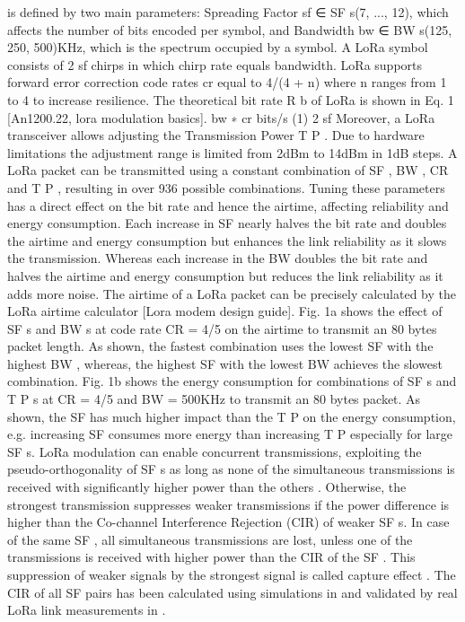 is defined by two main parameters:
	Spreading Factor sf ∈ SF s(7,
	..., 12),
	which affects the number of bits encoded per symbol,
	and Bandwidth bw ∈ BW s(125, 250, 500)KHz,
	which is the spectrum occupied by a symbol.
A LoRa symbol consists of 2 sf chirps in which chirp rate equals bandwidth.
LoRa supports forward error correction code rates cr equal to 4/(4 + n) where n ranges from 1 to 4 to increase resilience.
The theoretical bit rate R b of LoRa is shown in Eq. 1 [An1200.22,
	lora modulation basics].
bw ∗ cr bits/s (1) 2 sf Moreover,
	a LoRa transceiver allows adjusting the Transmission Power T P .
Due to hardware limitations the adjustment range is limited from 2dBm to 14dBm in 1dB steps.
A LoRa packet can be transmitted using a constant combination of SF ,
	BW ,
	CR and T P ,
	resulting in over 936 possible combinations.
Tuning these parameters has a direct effect on the bit rate and hence the airtime,
	affecting reliability and energy consumption.
Each increase in SF nearly halves the bit rate and doubles the airtime and energy consumption but enhances the link reliability as it slows the transmission.
Whereas each increase in the BW doubles the bit rate and halves the airtime and energy consumption but reduces the link reliability as it adds more noise.
The airtime of a LoRa packet can be precisely calculated by the LoRa airtime calculator [Lora modem design guide].
Fig. 1a shows the effect of SF s and BW s at code rate CR = 4/5 on the airtime to transmit an 80 bytes packet length.
As shown,
	the fastest combination uses the lowest SF with the highest BW ,
	whereas,
	the highest SF with the lowest BW achieves the slowest combination.
Fig. 1b shows the energy consumption for combinations of SF s and T P s at CR = 4/5 and BW = 500KHz to transmit an 80 bytes packet.
As shown,
	the SF has much higher impact than the T P on the energy consumption,
	e.g.
increasing SF consumes more energy than increasing T P especially for large SF s.
LoRa modulation can enable concurrent transmissions,
	exploiting the pseudo-orthogonality of SF s as long as none of the simultaneous transmissions is received with significantly higher power than the others \cite{goursaud_dedicated_2015}.
Otherwise,
	the strongest transmission suppresses weaker transmissions if the power difference is higher than the Co-channel Interference Rejection (CIR) of weaker SF s.
In case of the same SF ,
	all simultaneous transmissions are lost,
	unless one of the transmissions is received with higher power than the CIR of the SF .
This suppression of weaker signals by the strongest signal is called capture effect \cite{bor_lora_2016}.
The CIR of all SF pairs has been calculated using simulations in \cite{goursaud_dedicated_2015} and validated by real LoRa link measurements in \cite{piva_impact_2017}.

